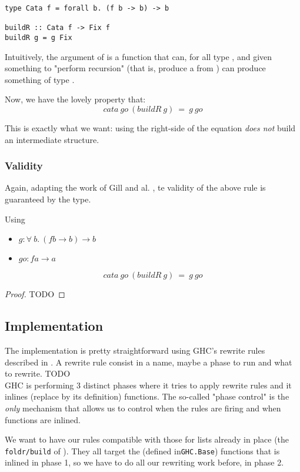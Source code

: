 \begin{verbatim}
type Cata f = forall b. (f b -> b) -> b

buildR :: Cata f -> Fix f
buildR g = g Fix
\end{verbatim}

Intuitively, the argument of  is a function that can, for all type , and given something to "perform recursion" (that is, produce a  from ) can produce something of type .

Now, we have the lovely property that:
$$cata\ go\ (buildR\ g)\ =\ g\ go$$

This is exactly what we want: using the right-side of the equation \emph{does not}
build an intermediate structure.

\subsubsection{Validity}
Again, adapting the work of Gill and al. \cite{Gill:1993:SCD:165180.165214}, te validity of the above rule is guaranteed by the type.

\begin{theorem}
Using
\begin{itemize}
	\item $g : \forall\ b.\ (f b \to b) \to b$
	\item $go : f a \to a $
\end{itemize}
$$cata\ go\ (buildR\ g)\ =\ g\ go$$
\end{theorem}
\begin{proof}
	TODO
\end{proof}

\subsection{Implementation}
The implementation is pretty straightforward using GHC's rewrite rules described in \cite{pbr}. A rewrite rule consist in a name, maybe a phase to run and what to rewrite. TODO\\
GHC is performing 3 distinct phases where it tries to apply rewrite rules and it inlines (replace by its definition) functions. The so-called "phase control" is the \emph{only} mechanism that allows us to control when the rules are firing and when functions are inlined.

We want to have our rules compatible with those for lists already in place (the \verb|foldr/build| of \cite{Gill:1993:SCD:165180.165214}). They all target the  (defined in\verb|GHC.Base|) functions that is inlined in phase 1, so we have to do all our rewriting work before, in phase 2.

